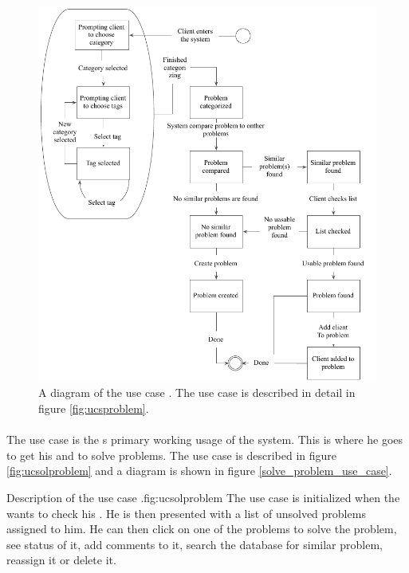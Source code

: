 \begin{figure}[htbp]
\begin{center}
 \includegraphics[scale=1]{input/application_domain_analysis/submit_problem_use_case}
\caption{A diagram of the use case \ucsproblem{}. The use case is described in detail in figure \ref{fig:ucsproblem}.}
\label{fig:submit_problem_use_case}
\end{center}
\end{figure}



\paragraph{\ucsolproblem{}} The use case \ucsolproblem{} is the \astaff{}s primary working usage of the system. This is where he goes to get his \todolist{} and to solve problems. The use case is described in figure \ref{fig:ucsolproblem} and a diagram is shown in figure \ref{solve_problem_use_case}.


\begin{sadlist}[h]{\ucsolproblem[c]}{Description of the use case \ucsolproblem{}.}{fig:ucsolproblem}
 The use case is initialized when the \astaff[] wants to check his \todolist[]. He is then presented with a list of unsolved problems assigned to him. He can then click on one of the problems to solve the problem, see status of it, add comments to it, search the database for similar problem, reassign it or delete it.
\end{sadlist}


